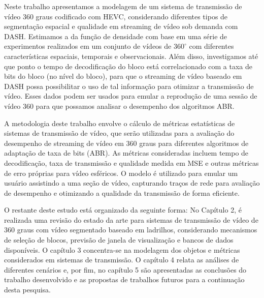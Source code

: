 
Neste trabalho apresentamos a modelagem de um sistema de transmissão de vídeo 360 graus codificado com HEVC, considerando diferentes tipos de segmentação espacial e qualidade em streaming de vídeo sob demanda com DASH. Estimamos a da função de densidade com base em uma série de experimentos realizados em um conjunto de vídeos de $360^\circ$ com diferentes características espaciais, temporais e observacionais. Além disso, investigamos até que ponto o tempo de decodificação do bloco está correlacionado com a taxa de bits do bloco (no nível do bloco), para que o streaming de vídeo baseado em DASH possa possibilitar o uso de tal informação para otimizar a transmissão de vídeo. Esses dados podem ser usados para emular a reprodução de uma sessão de vídeo 360 para que possamos analisar o desempenho dos algoritmos ABR.


A metodologia deste trabalho envolve o cálculo de métricas estatísticas de sistemas de transmissão de vídeo, que serão utilizadas para a avaliação do desempenho de streaming de vídeo em 360 graus para diferentes algoritmos de adaptação de taxa de bits (ABR). As métricas consideradas incluem tempo de decodificação, taxa de transmissão e qualidade medida em MSE e outras métricas de erro próprias para vídeo esféricos. O modelo é utilizado para emular um usuário assistindo a uma seção de vídeo, capturando traços de rede para avaliação de desempenho e otimizando a qualidade da transmissão de forma eficiente.


O restante deste estudo está organizado da seguinte forma: No Capítulo 2, é realizada uma revisão do estado da arte para sistemas de transmissão de vídeo de 360 graus com vídeo segmentado baseado em ladrilhos, considerando mecanismos de seleção de blocos, previsão de janela de visualização e bancos de dados disponíveis. O capítulo 3 concentra-se na modelagem dos objetos e métricas considerados em sistemas de transmissão. O capítulo 4 relata as análises de diferentes cenários e, por fim, no capítulo 5 são apresentadas as conclusões do trabalho desenvolvido e as propostas de trabalhos futuros para a continuação desta pesquisa.
